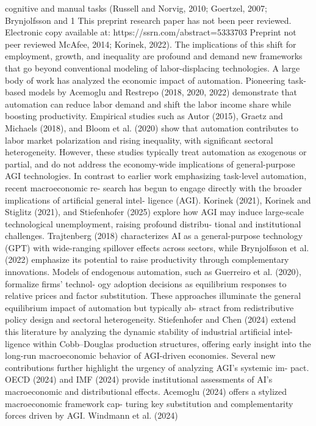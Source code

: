 cognitive and manual tasks (Russell and Norvig, 2010; Goertzel, 2007; Brynjolfsson and
1
This preprint research paper has not been peer reviewed. Electronic copy available at: https://ssrn.com/abstract=5333703
Preprint not peer reviewed
McAfee, 2014; Korinek, 2022). The implications of this shift for employment, growth, and
inequality are profound and demand new frameworks that go beyond conventional modeling
of labor-displacing technologies.
A large body of work has analyzed the economic impact of automation. Pioneering task-
based models by Acemoglu and Restrepo (2018, 2020, 2022) demonstrate that automation
can reduce labor demand and shift the labor income share while boosting productivity.
Empirical studies such as Autor (2015), Graetz and Michaels (2018), and Bloom et al.
(2020) show that automation contributes to labor market polarization and rising inequality,
with significant sectoral heterogeneity. However, these studies typically treat automation as
exogenous or partial, and do not address the economy-wide implications of general-purpose
AGI technologies.
In contrast to earlier work emphasizing task-level automation, recent macroeconomic re-
search has begun to engage directly with the broader implications of artificial general intel-
ligence (AGI). Korinek (2021), Korinek and Stiglitz (2021), and Stiefenhofer (2025) explore
how AGI may induce large-scale technological unemployment, raising profound distribu-
tional and institutional challenges. Trajtenberg (2018) characterizes AI as a general-purpose
technology (GPT) with wide-ranging spillover effects across sectors, while Brynjolfsson et al.
(2022) emphasize its potential to raise productivity through complementary innovations.
Models of endogenous automation, such as Guerreiro et al. (2020), formalize firms’ technol-
ogy adoption decisions as equilibrium responses to relative prices and factor substitution.
These approaches illuminate the general equilibrium impact of automation but typically ab-
stract from redistributive policy design and sectoral heterogeneity. Stiefenhofer and Chen
(2024) extend this literature by analyzing the dynamic stability of industrial artificial intel-
ligence within Cobb–Douglas production structures, offering early insight into the long-run
macroeconomic behavior of AGI-driven economies.
Several new contributions further highlight the urgency of analyzing AGI’s systemic im-
pact. OECD (2024) and IMF (2024) provide institutional assessments of AI’s macroeconomic
and distributional effects. Acemoglu (2024) offers a stylized macroeconomic framework cap-
turing key substitution and complementarity forces driven by AGI. Windmann et al. (2024)
